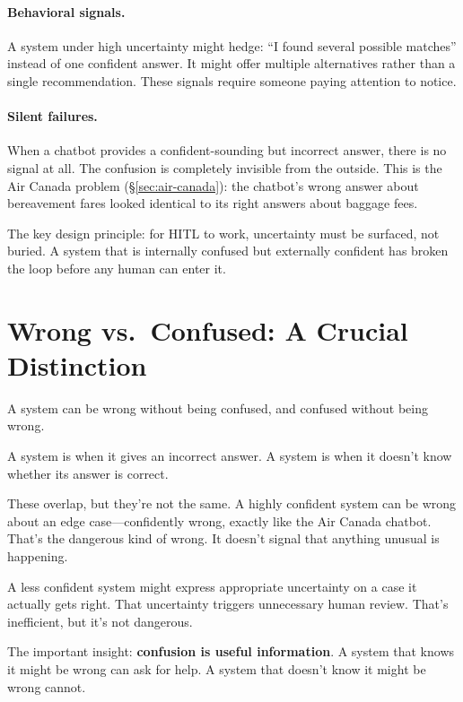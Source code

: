 \paragraph{Behavioral signals.} A system under high uncertainty might hedge: ``I found several possible matches'' instead of one confident answer. It might offer multiple alternatives rather than a single recommendation. These signals require someone paying attention to notice.

\paragraph{Silent failures.} When a chatbot provides a confident-sounding but incorrect answer, there is no signal at all. The confusion is completely invisible from the outside. This is the Air Canada problem (\S\ref{sec:air-canada}): the chatbot's wrong answer about bereavement fares looked identical to its right answers about baggage fees.

The key design principle: for HITL to work, uncertainty must be surfaced, not buried. A system that is internally confused but externally confident has broken the loop before any human can enter it.

\section{Wrong vs.\ Confused: A Crucial Distinction}

A system can be wrong without being confused, and confused without being wrong.

A system is  when it gives an incorrect answer. A system is  when it doesn't know whether its answer is correct.

These overlap, but they're not the same. A highly confident system can be wrong about an edge case---confidently wrong, exactly like the Air Canada chatbot. That's the dangerous kind of wrong. It doesn't signal that anything unusual is happening.

A less confident system might express appropriate uncertainty on a case it actually gets right. That uncertainty triggers unnecessary human review. That's inefficient, but it's not dangerous.

The important insight: \textbf{confusion is useful information}. A system that knows it might be wrong can ask for help. A system that doesn't know it might be wrong cannot.

